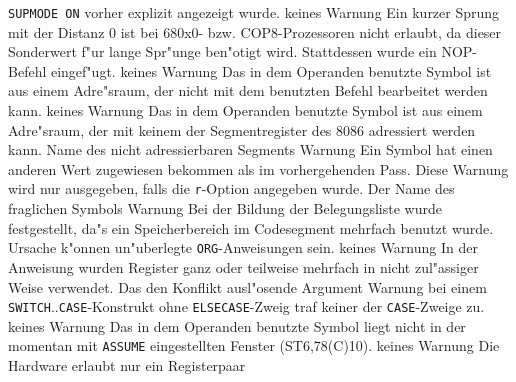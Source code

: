 \documentclass[12pt,a4paper,twoside]{report}
\newcommand{\tty}[1]{{\tt #1}}
\begin{document}
\begin{description}
{                \tty{SUPMODE ON} vorher explizit angezeigt wurde.}
               {keines}
               {Warnung}
               {Ein kurzer Sprung mit der Distanz 0 ist bei
                680x0- bzw. COP8-Prozessoren nicht erlaubt, da dieser Sonderwert f"ur
                lange Spr"unge ben"otigt wird.  Stattdessen wurde ein
                NOP-Befehl eingef"ugt.}
               {keines}
               {Warnung}
               {Das in dem Operanden benutzte Symbol
                ist aus einem Adre"sraum, der nicht mit dem benutzten
                Befehl bearbeitet werden kann.}
               {keines}
               {Warnung}
               {Das in dem Operanden benutzte Symbol
                ist aus einem Adre"sraum, der mit keinem der Segmentregister
                des 8086 adressiert werden kann.}
               {Name des nicht adressierbaren Segments}
               {Warnung}
               {Ein Symbol hat einen anderen Wert zugewiesen
                bekommen als im vorhergehenden Pass.  Diese Warnung wird
                nur ausgegeben, falls die \tty{r}-Option angegeben wurde.}
               {Der Name des fraglichen Symbols}
               {Warnung}
               {Bei der Bildung der Belegungsliste wurde
                festgestellt, da"s ein Speicherbereich im Codesegment
                mehrfach benutzt wurde.  Ursache k"onnen un"uberlegte
                \tty{ORG}-Anweisungen sein.}
               {keines}
               {Warnung}
               {In der Anweisung wurden Register ganz oder teilweise
                mehrfach in nicht zul"assiger Weise verwendet.}
               {Das den Konflikt ausl"osende Argument}
               {Warnung}
               {bei einem \tty{SWITCH}..\tty{CASE}-Konstrukt ohne
                \tty{ELSECASE}-Zweig traf keiner der \tty{CASE}-Zweige zu.}
               {keines}
               {Warnung}
               {Das in dem Operanden benutzte Symbol
                liegt nicht in der momentan mit \tty{ASSUME} eingestellten
                Fenster (ST6,78(C)10).}
               {keines}
               {Warnung}
               {Die Hardware erlaubt nur ein Registerpaar
}
\end{description}
\end{document}
